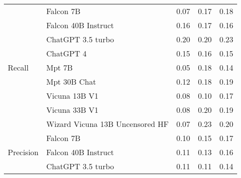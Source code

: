 \begin{table}[!htbp]
\begin{tabular}{l|l|rrr}
\midrule
\multirow{9}{*}{Recall}  & Falcon 7B & {\cellcolor[HTML]{FEE6CE}} \color[HTML]{000000} 0.07 & {\cellcolor[HTML]{EE6410}} \color[HTML]{F1F1F1} 0.17 & {\cellcolor[HTML]{E05206}} \color[HTML]{F1F1F1} 0.18 \\
&Falcon 40B Instruct & {\cellcolor[HTML]{F3701B}} \color[HTML]{F1F1F1} 0.16 & {\cellcolor[HTML]{F06712}} \color[HTML]{F1F1F1} 0.17 & {\cellcolor[HTML]{F16913}} \color[HTML]{F1F1F1} 0.16 \\
&ChatGPT 3.5 turbo & {\cellcolor[HTML]{B93D02}} \color[HTML]{F1F1F1} 0.20 & {\cellcolor[HTML]{C03F02}} \color[HTML]{F1F1F1} 0.20 & {\cellcolor[HTML]{8B2C04}} \color[HTML]{F1F1F1} 0.23 \\
&ChatGPT 4 & {\cellcolor[HTML]{F9802D}} \color[HTML]{F1F1F1} 0.15 & {\cellcolor[HTML]{F4721E}} \color[HTML]{F1F1F1} 0.16 & {\cellcolor[HTML]{FB8634}} \color[HTML]{F1F1F1} 0.15 \\
&Mpt 7B & {\cellcolor[HTML]{FFF5EB}} \color[HTML]{000000} 0.05 & {\cellcolor[HTML]{DE5005}} \color[HTML]{F1F1F1} 0.18 & {\cellcolor[HTML]{FC8B3A}} \color[HTML]{F1F1F1} 0.14 \\
&Mpt 30B Chat & {\cellcolor[HTML]{FDA35C}} \color[HTML]{000000} 0.12 & {\cellcolor[HTML]{DF5106}} \color[HTML]{F1F1F1} 0.18 & {\cellcolor[HTML]{DB4A02}} \color[HTML]{F1F1F1} 0.19 \\
&Vicuna 13B V1 & {\cellcolor[HTML]{FDD8B2}} \color[HTML]{000000} 0.08 & {\cellcolor[HTML]{FDC692}} \color[HTML]{000000} 0.10 & {\cellcolor[HTML]{E65A0B}} \color[HTML]{F1F1F1} 0.17 \\
&Vicuna 33B V1 & {\cellcolor[HTML]{FEDDBC}} \color[HTML]{000000} 0.08 & {\cellcolor[HTML]{C34002}} \color[HTML]{F1F1F1} 0.20 & {\cellcolor[HTML]{D94801}} \color[HTML]{F1F1F1} 0.19 \\
&Wizard Vicuna 13B Uncensored HF & {\cellcolor[HTML]{FEE6CF}} \color[HTML]{000000} 0.07 & {\cellcolor[HTML]{7F2704}} \color[HTML]{F1F1F1} 0.23 & {\cellcolor[HTML]{B93D02}} \color[HTML]{F1F1F1} 0.20 \\
\midrule
\multirow{9}{*}{Precision} & Falcon 7B & {\cellcolor[HTML]{C1C2DF}} \color[HTML]{000000} 0.10 & {\cellcolor[HTML]{65489F}} \color[HTML]{F1F1F1} 0.15 & {\cellcolor[HTML]{470F84}} \color[HTML]{F1F1F1} 0.17 \\
&Falcon 40B Instruct & {\cellcolor[HTML]{A7A4CE}} \color[HTML]{F1F1F1} 0.11 & {\cellcolor[HTML]{7B74B5}} \color[HTML]{F1F1F1} 0.13 & {\cellcolor[HTML]{582F93}} \color[HTML]{F1F1F1} 0.16 \\
&ChatGPT 3.5 turbo & {\cellcolor[HTML]{A29FCB}} \color[HTML]{F1F1F1} 0.11 & {\cellcolor[HTML]{A09DCA}} \color[HTML]{F1F1F1} 0.11 & {\cellcolor[HTML]{6E58A7}} \color[HTML]{F1F1F1} 0.14 \\

\end{tabular}
\end{table}
